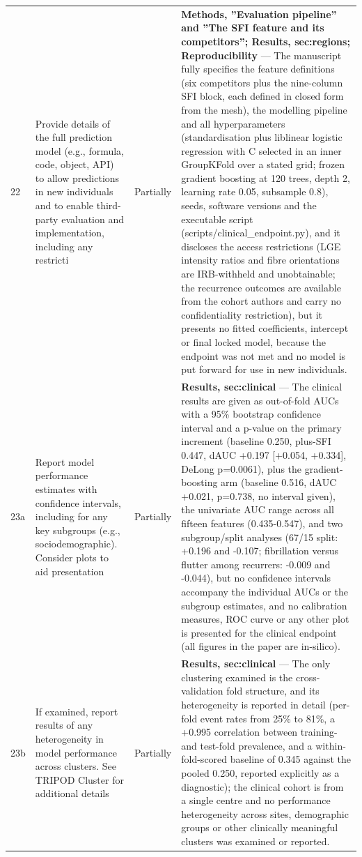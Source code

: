 \documentclass[10pt]{article}
\begin{document}
\begin{longtable}{@{}p{0.9cm} p{6.2cm} p{1.9cm} p{12.4cm}@{}}
22 & Provide details of the full prediction model (e.g., formula, code, object, API) to allow predictions in new individuals and to enable third-party evaluation and implementation, including any restricti & Partially & \textbf{Methods, ''Evaluation pipeline'' and ''The SFI feature and its competitors''; Results, sec:regions; Reproducibility} --- The manuscript fully specifies the feature definitions (six competitors plus the nine-column SFI block, each defined in closed form from the mesh), the modelling pipeline and all hyperparameters (standardisation plus liblinear logistic regression with C selected in an inner GroupKFold over a stated grid; frozen gradient boosting at 120 trees, depth 2, learning rate 0.05, subsample 0.8), seeds, software versions and the executable script (scripts/clinical\_endpoint.py), and it discloses the access restrictions (LGE intensity ratios and fibre orientations are IRB-withheld and unobtainable; the recurrence outcomes are available from the cohort authors and carry no confidentiality restriction), but it presents no fitted coefficients, intercept or final locked model, because the endpoint was not met and no model is put forward for use in new individuals. \\[2pt]
23a & Report model performance estimates with confidence intervals, including for any key subgroups (e.g., sociodemographic). Consider plots to aid presentation & Partially & \textbf{Results, sec:clinical} --- The clinical results are given as out-of-fold AUCs with a 95\% bootstrap confidence interval and a p-value on the primary increment (baseline 0.250, plus-SFI 0.447, dAUC +0.197 [+0.054, +0.334], DeLong p=0.0061), plus the gradient-boosting arm (baseline 0.516, dAUC +0.021, p=0.738, no interval given), the univariate AUC range across all fifteen features (0.435-0.547), and two subgroup/split analyses (67/15 split: +0.196 and -0.107; fibrillation versus flutter among recurrers: -0.009 and -0.044), but no confidence intervals accompany the individual AUCs or the subgroup estimates, and no calibration measures, ROC curve or any other plot is presented for the clinical endpoint (all figures in the paper are in-silico). \\[2pt]
23b & If examined, report results of any heterogeneity in model performance across clusters. See TRIPOD Cluster for additional details & Partially & \textbf{Results, sec:clinical} --- The only clustering examined is the cross-validation fold structure, and its heterogeneity is reported in detail (per-fold event rates from 25\% to 81\%, a +0.995 correlation between training- and test-fold prevalence, and a within-fold-scored baseline of 0.345 against the pooled 0.250, reported explicitly as a diagnostic); the clinical cohort is from a single centre and no performance heterogeneity across sites, demographic groups or other clinically meaningful clusters was examined or reported. \\[2pt]

\end{longtable}
\end{document}
